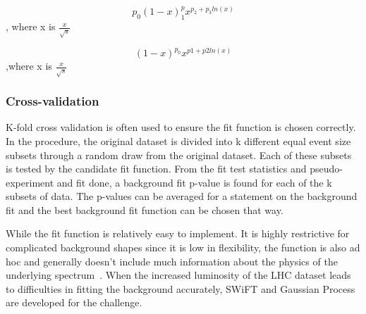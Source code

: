     \begin{equation}
        p_{0}(1-x)^p_{1}x^{p_{2}+p_{3}ln(x)}
        \end{equation}, where x is $\frac{x}{\sqrt{s}}$ ~\cite{2009}

    \begin{equation}
        (1-x)^{p_{0}}x^{p1+p2ln(x)}
    \end{equation},where x is $\frac{x}{\sqrt{s}}$~\cite{2014}

\subsubsection{Cross-validation}
    K-fold cross validation is often used to ensure the fit function is chosen correctly. In the procedure, the original dataset is divided into k different equal event size subsets through a random draw from the original dataset. Each of these subsets is tested by the candidate fit function. From the fit test statistics and pseudo-experiment and fit done, a background fit p-value is found for each of the k subsets of data. The p-values can be averaged for a statement on the background fit and the best background fit function can be chosen that way. 

    While the fit function is relatively easy to implement. It is highly restrictive for complicated background shapes since it is low in flexibility, the function is also ad hoc and generally doesn't include much information about the physics of the underlying spectrum~\cite{ATL-PHYS-PUB-2020-028}. When the increased luminosity of the LHC dataset leads to difficulties in fitting the background accurately, SWiFT and Gaussian Process are developed for the challenge. 

